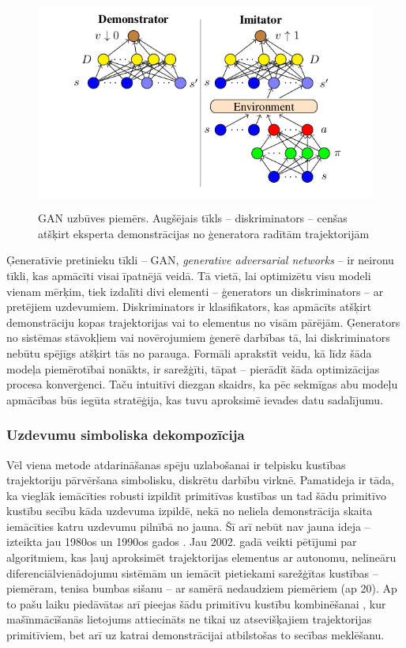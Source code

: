 \documentclass[12pt, a4paper]{article}
\numberwithin{equation}{section} %
\begin{document}
\begin{figure}[t!]
    \centering
    \includegraphics[height=7cm,page=1]{../img/GAN.png}
    \caption{GAN uzbūves piemērs. Augšējais tīkls -- diskriminators -- cenšas atšķirt eksperta demonstrācijas no ģeneratora radītām trajektorijām \cite{torabi2018generative}}
\end{figure}

Ģeneratīvie pretinieku tīkli -- GAN, \textit{generative adversarial networks} -- ir neironu tīkli, kas apmācīti visai īpatnējā veidā. Tā vietā, lai optimizētu visu modeli vienam mērķim, tiek izdalīti divi elementi -- ģenerators un diskriminators -- ar pretējiem uzdevumiem. Diskriminators ir klasifikators, kas apmācīts atšķirt demonstrāciju kopas trajektorijas vai to elementus no visām pārējām. Ģenerators no sistēmas stāvokļiem vai novērojumiem ģenerē darbības tā, lai diskriminators nebūtu spējīgs atšķirt tās no parauga. Formāli aprakstīt veidu, kā līdz šāda modeļa piemērotībai nonākts, ir sarežģīti, tāpat -- pierādīt šāda optimizācijas procesa konverģenci. Taču intuitīvi diezgan skaidrs, ka pēc sekmīgas abu modeļu apmācības būs iegūta stratēģija, kas tuvu aproksimē ievades datu sadalījumu.

\subsubsection{Uzdevumu simboliska dekompozīcija}

Vēl viena metode atdarināšanas spēju uzlabošanai ir telpisku kustības trajektoriju pārvēršana simbolisku, diskrētu darbību virknē. Pamatideja ir tāda, ka vieglāk iemācīties robusti izpildīt primitīvas kustības un tad šādu primitīvo kustību secību kāda uzdevuma izpildē, nekā no neliela demonstrācija skaita iemācīties katru uzdevumu pilnībā no jauna. Šī arī nebūt nav jauna ideja -- izteikta jau 1980os un 1990os gados \cite{muench1994robot}. Jau 2002. gadā veikti pētījumi par algoritmiem, kas ļauj aproksimēt trajektorijas elementus ar autonomu, nelineāru diferenciālvienādojumu sistēmām \cite{ijspeert2002movement} un iemācīt pietiekami sarežģītas kustības -- piemēram, tenisa bumbas sišanu -- ar samērā nedaudziem piemēriem (ap 20). Ap to pašu laiku piedāvātas arī pieejas šādu primitīvu kustību kombinēšanai \cite{schaal2003computational}, kur mašīnmācīšanās lietojums attiecināts ne tikai uz atsevišķajiem trajektorijas primitīviem, bet arī uz katrai demonstrācijai atbilstošas to secības meklēšanu.
\end{document}
